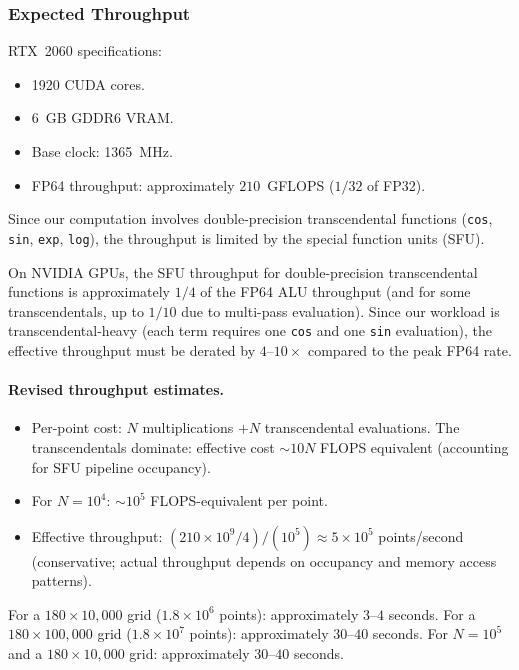 \subsubsection{Expected Throughput}
\label{sec:throughput}

RTX~2060 specifications:
\begin{itemize}
  \item 1920 CUDA cores.
  \item 6~GB GDDR6 VRAM.
  \item Base clock: 1365~MHz.
  \item FP64 throughput: approximately $210$~GFLOPS ($1/32$ of FP32).
\end{itemize}

Since our computation involves double-precision transcendental functions (\texttt{cos},
\texttt{sin}, \texttt{exp}, \texttt{log}), the throughput is limited by the special
function units (SFU).

\begin{remark}\label{rem:sfu}
On NVIDIA GPUs, the SFU throughput for double-precision transcendental functions is
approximately $1/4$ of the FP64 ALU throughput (and for some transcendentals, up to
$1/10$ due to multi-pass evaluation). Since our workload is transcendental-heavy (each
term requires one \texttt{cos} and one \texttt{sin} evaluation), the effective throughput
must be derated by $4$--$10\times$ compared to the peak FP64 rate.
\end{remark}

\paragraph{Revised throughput estimates.}
\begin{itemize}
  \item Per-point cost: $N$ multiplications $+ N$ transcendental evaluations. The
        transcendentals dominate: effective cost $\sim 10N$ FLOPS equivalent (accounting
        for SFU pipeline occupancy).
  \item For $N = 10^4$: $\sim 10^5$ FLOPS-equivalent per point.
  \item Effective throughput:
        $(210 \times 10^9/4)/(10^5) \approx 5 \times 10^5$ points/second (conservative;
        actual throughput depends on occupancy and memory access patterns).
\end{itemize}

For a $180 \times 10{,}000$ grid ($1.8 \times 10^6$ points): approximately $3$--$4$
seconds. For a $180 \times 100{,}000$ grid ($1.8 \times 10^7$ points): approximately
$30$--$40$ seconds. For $N = 10^5$ and a $180 \times 10{,}000$ grid: approximately
$30$--$40$ seconds.

